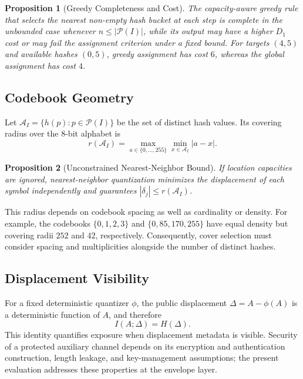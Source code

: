 \documentclass[preprint,12pt]{elsarticle}
\theoremstyle{plain}
\newtheorem{proposition}{Proposition}
\providecommand{\DIFaddtex}[1]{{\protect\color{blue} \sf #1}} %
\providecommand{\DIFdeltex}[1]{{\protect\color{red} \scriptsize #1}} %
\providecommand{\DIFaddbegin}{} %
\providecommand{\DIFaddend}{} %
\providecommand{\DIFdelbegin}{} %
\providecommand{\DIFdelend}{} %
\providecommand{\DIFadd}[1]{\texorpdfstring{\DIFaddtex{#1}}{#1}} %
\providecommand{\DIFdel}[1]{\texorpdfstring{\DIFdeltex{#1}}{}} %
\providecommand{\DIFscaledelfig}{0.5}
\newlength{\DIFdelgraphicswidth} %
\newlength{\DIFdelgraphicsheight} %
\providecommand{\DIFaddincludegraphics}[2][]{{\color{blue}\fbox{\DIFOincludegraphics[#1]{#2}}}} %
\providecommand{\DIFdelincludegraphics}[2][]{%
\sbox{\DIFdelgraphicsbox}{\DIFOincludegraphics[#1]{#2}}%
\settoboxwidth{\DIFdelgraphicswidth}{\DIFdelgraphicsbox} %
\settoboxtotalheight{\DIFdelgraphicsheight}{\DIFdelgraphicsbox} %
\scalebox{\DIFscaledelfig}{%
\parbox[b]{\DIFdelgraphicswidth}{\usebox{\DIFdelgraphicsbox}\\[-\baselineskip] \rule{\DIFdelgraphicswidth}{0em}}\llap{\resizebox{\DIFdelgraphicswidth}{\DIFdelgraphicsheight}{%
\setlength{\unitlength}{\DIFdelgraphicswidth}%
\begin{picture}(1,1)%
\thicklines\linethickness{2pt} %
{\color[rgb]{1,0,0}\put(0,0){\framebox(1,1){}}}%
{\color[rgb]{1,0,0}\put(0,0){\line( 1,1){1}}}%
{\color[rgb]{1,0,0}\put(0,1){\line(1,-1){1}}}%
\end{picture}%
}\hspace*{3pt}}} %
} %
\DeclareRobustCommand{\DIFaddbegin}{\DIFOaddbegin \let\includegraphics\DIFaddincludegraphics} %
\DeclareRobustCommand{\DIFaddend}{\DIFOaddend \let\includegraphics\DIFOincludegraphics} %
\DeclareRobustCommand{\DIFdelbegin}{\DIFOdelbegin \let\includegraphics\DIFdelincludegraphics} %
\DeclareRobustCommand{\DIFdelend}{\DIFOaddend \let\includegraphics\DIFOincludegraphics} %
\renewcommand{\DIFdel}[1]{}
\renewcommand{\DIFdelincludegraphics}[2][]{}
\begin{document}
\DIFdelbegin %
\DIFdelend \DIFaddbegin \begin{proposition}[Greedy Completeness and Cost]
\DIFaddend The capacity-aware greedy rule that selects the nearest non-empty hash bucket
at each step is complete in the unbounded case whenever
$n\leq|\mathcal{P}(I)|$, \DIFdelbegin \DIFdel{but it need not minimize }\DIFdelend \DIFaddbegin \DIFadd{while its output may have a higher }\DIFaddend $D_1$ \DIFdelbegin \DIFdel{or find a feasible
assignment }\DIFdelend \DIFaddbegin \DIFadd{cost or may fail the
assignment criterion }\DIFaddend under a fixed bound. For targets $(4,5)$ and available hashes $(0,5)$, greedy
assignment has cost $6$, whereas the global assignment has cost $4$.
\end{proposition}

\subsection{Codebook Geometry}

Let $\mathcal{A}_I=\{h(p):p\in\mathcal{P}(I)\}$ be the set of distinct hash
values. Its covering radius over the 8-bit alphabet is
\begin{equation}
    r(\mathcal{A}_I)=
    \max_{a\in\{0,\ldots,255\}}\min_{x\in\mathcal{A}_I}|a-x|.
\end{equation}

\begin{proposition}[Unconstrained Nearest-Neighbor Bound]
If location capacities are ignored, nearest-neighbor quantization minimizes
the displacement of each symbol independently and guarantees
$|\delta_j|\leq r(\mathcal{A}_I)$.
\end{proposition}

This radius depends on codebook spacing as well as cardinality or density. For example,
the codebooks $\{0,1,2,3\}$ and $\{0,85,170,255\}$ have equal density but
covering radii $252$ and $42$, respectively. Consequently, cover selection
must consider spacing and multiplicities alongside the number of distinct
hashes.

\subsection{Displacement Visibility}

For a fixed deterministic quantizer $\phi$, the public displacement
$\Delta=A-\phi(A)$ is a deterministic function of $A$, and therefore
\begin{equation}
    I(A;\Delta)=H(\Delta).
\end{equation}
This identity quantifies exposure when displacement metadata is visible.
Security of a protected auxiliary channel depends on its encryption and
authentication construction, length leakage, and key-management assumptions;
the present evaluation addresses these properties at the envelope layer.
\end{document}
